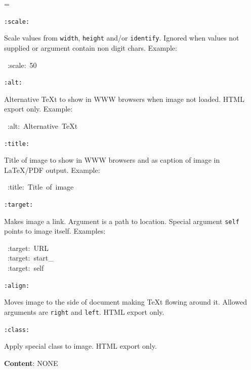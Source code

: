 \documentclass[12pt]{article}
\newenvironment{deflist}[1]{%
\begin{list}{}
{\renewcommand{\makelabel}[1]{\textbf{##1}\hfill}
\settowidth{\labelwidth}{\textbf{#1}}
\leftmargin=\labelwidth
\advance \leftmargin\labelsep}}
{\end{list}}
\begin{document}
\begin{itemize}
\begin{deflist}{iii}
\item[ \texttt{:scale:}]

Scale values from \texttt{width}, \texttt{height} and/or \texttt{identify}. Ignored
when values not supplied or argument contain non digit chars. Example:

\begin{ttfamily}\begin{flushleft}
\mbox{~:scale:~50}\\
\end{flushleft}\end{ttfamily}

\item[ \texttt{:alt:}]

Alternative \TeX{}t to show in WWW browsers when image not loaded. HTML
export only. Example:

\begin{ttfamily}\begin{flushleft}
\mbox{~:alt:~Alternative~\TeX{}t}\\
\end{flushleft}\end{ttfamily}

\item[ \texttt{:title:}]

Title of image to show in WWW browsers and as caption of image in
\LaTeX{}/PDF output. Example:

\begin{ttfamily}\begin{flushleft}
\mbox{~:title:~Title~of~image}\\
\end{flushleft}\end{ttfamily}

\item[ \texttt{:target:}]

Makes image a link. Argument is a path to location. Special argument
\texttt{self} points to image itself. Examples:

\begin{ttfamily}\begin{flushleft}
\mbox{~:target:~URL}\\
\mbox{~:target:~start\_}\\
\mbox{~:target:~self}\\
\end{flushleft}\end{ttfamily}

\item[ \texttt{:align:}]

Moves image to the side of document making \TeX{}t flowing around it.
Allowed arguments are \texttt{right} and \texttt{left}. HTML export only.

\item[ \texttt{:class:}]

Apply special class to image. HTML export only.
\end{deflist}

\item
\textbf{Content}: NONE
\end{itemize}
\hypertarget{limage-examples}{}
\end{document}
